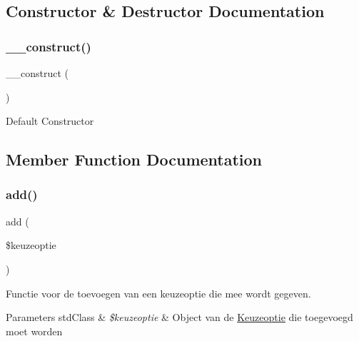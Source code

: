 \subsection{Constructor \& Destructor Documentation}
\mbox{\label{class_keuzeoptie___model_a095c5d389db211932136b53f25f39685}} 
\subsubsection{\texorpdfstring{\+\_\+\+\_\+construct()}{\_\_construct()}}
{\footnotesize\ttfamily \+\_\+\+\_\+construct (\begin{DoxyParamCaption}{ }\end{DoxyParamCaption})}

Default Constructor 

\subsection{Member Function Documentation}
\mbox{\label{class_keuzeoptie___model_a2452f524e794bc3f418d60cb296e19b5}} 
\subsubsection{\texorpdfstring{add()}{add()}}
{\footnotesize\ttfamily add (\begin{DoxyParamCaption}\item[{}]{\$keuzeoptie }\end{DoxyParamCaption})}

Functie voor de toevoegen van een keuzeoptie die mee wordt gegeven. 
\begin{DoxyParams}[1]{Parameters}
std\+Class & {\em \$keuzeoptie} & Object van de \mbox{\hyperlink{class_keuzeoptie}{Keuzeoptie}} die toegevoegd moet worden \\
\hline
\end{DoxyParams}
\mbox{\label{class_keuzeoptie___model_a2f8258add505482d7f00ea26493a5723}} 
